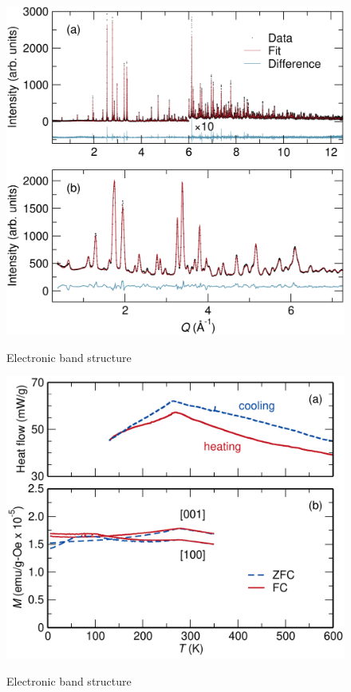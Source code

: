 \documentclass[11pt,edeposit,draftthesis]{uiucthesis2020}
\begin{document}
\begin{mainmatter}
\begin{figure}
\centering\includegraphics[width=\columnwidth]{figures/ch5/h-cumnas_11bm_100k_wand_400k_combine.png} \\
\caption{\label{fig:11BM_WAND}
Electronic band structure
}
\end{figure}

\begin{figure}
\centering\includegraphics[width=\columnwidth]{figures/ch5/dsc-mpms_norm_cropped.pdf} \\
\caption{\label{fig:dsc_mpms}
Electronic band structure
}
\end{figure}


\end{mainmatter}
\end{document}
